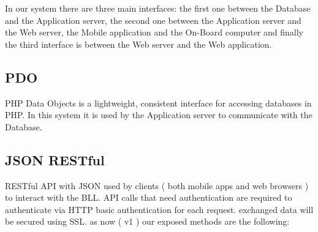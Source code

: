 In our system there are three main interfaces: the first one between the Database and the Application server, the second one between the Application server and the Web server, the Mobile application and the On-Board computer and finally the third interface is between the Web server and the Web application.

\subsection{PDO}
PHP Data Objects is a lightweight, consistent interface for accessing databases in PHP. In this system it is used by the Application server to communicate with the Database.
 	
\subsection{JSON RESTful}
RESTful API with JSON used by clients ( both mobile apps and web
browsers ) to interact with the BLL. API calls that need authentication are
required to authenticate via HTTP basic authentication for each request. exchanged
data will be secured using SSL.
as now ( v1 ) our exposed methods are the following:
